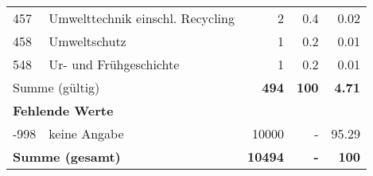 \begin{longtable}{lXrrr}
        457 & \multicolumn{1}{X}{Umwelttechnik einschl. Recycling} & %
          \num{2} &
          \num[round-mode=places,round-precision=2]{0.4} &
          \num[round-mode=places,round-precision=2]{0.02} \\

        458 & \multicolumn{1}{X}{Umweltschutz} & %
          \num{1} &
          \num[round-mode=places,round-precision=2]{0.2} &
          \num[round-mode=places,round-precision=2]{0.01} \\

        548 & \multicolumn{1}{X}{Ur- und Frühgeschichte} & %
          \num{1} &
          \num[round-mode=places,round-precision=2]{0.2} &
          \num[round-mode=places,round-precision=2]{0.01} \\

     \midrule
     \multicolumn{2}{l}{Summe (gültig)} &
       \textbf{\num{494}} &
     \textbf{\num{100}} &
       \textbf{\num[round-mode=places,round-precision=2]{4.71}} \\
     \multicolumn{5}{l}{\textbf{Fehlende Werte}}\\
       -998 &
       keine Angabe &
         \num{10000} &
        - &
         \num[round-mode=places,round-precision=2]{95.29} \\
     \midrule
     \multicolumn{2}{l}{\textbf{Summe (gesamt)}} &
          \textbf{\num{10494}} &
        \textbf{-} &
        \textbf{\num{100}} \\
     \bottomrule
     \end{longtable}
     

